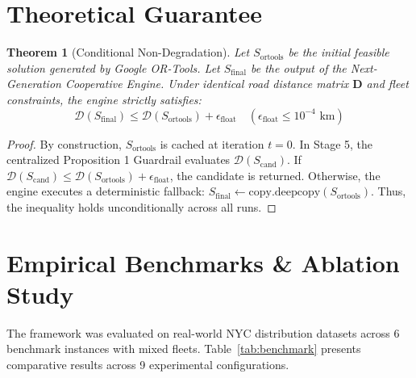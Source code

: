 \documentclass[journal,10pt]{IEEEtran}
\newtheorem{theorem}{Theorem}
\begin{document}
\section{Theoretical Guarantee}
\begin{theorem}[Conditional Non-Degradation]
Let $S_{\text{ortools}}$ be the initial feasible solution generated by Google OR-Tools. Let $S_{\text{final}}$ be the output of the Next-Generation Cooperative Engine. Under identical road distance matrix $\mathbf{D}$ and fleet constraints, the engine strictly satisfies:
\begin{equation}
\mathcal{D}(S_{\text{final}}) \le \mathcal{D}(S_{\text{ortools}}) + \epsilon_{\text{float}} \quad (\epsilon_{\text{float}} \le 10^{-4}\text{ km})
\end{equation}
\end{theorem}
\begin{proof}
By construction, $S_{\text{ortools}}$ is cached at iteration $t = 0$. In Stage 5, the centralized Proposition 1 Guardrail evaluates $\mathcal{D}(S_{\text{cand}})$. If $\mathcal{D}(S_{\text{cand}}) \le \mathcal{D}(S_{\text{ortools}}) + \epsilon_{\text{float}}$, the candidate is returned. Otherwise, the engine executes a deterministic fallback: $S_{\text{final}} \leftarrow \text{copy.deepcopy}(S_{\text{ortools}})$. Thus, the inequality holds unconditionally across all runs.
\end{proof}

\section{Empirical Benchmarks & Ablation Study}
The framework was evaluated on real-world NYC distribution datasets across 6 benchmark instances with mixed fleets. Table~\ref{tab:benchmark} presents comparative results across 9 experimental configurations.
\end{document}
